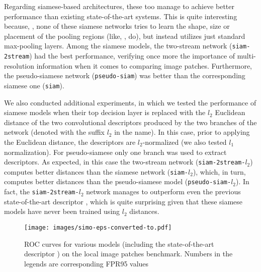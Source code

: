 \documentclass[10pt,twocolumn,letterpaper]{article}
\newcommand*{\USEIMAGES}{}
\begin{document}
Regarding siamese-based architectures, these too manage to achieve  better performance than  existing state-of-the-art systems. This is quite interesting because, \eg, none of these siamese networks tries to learn the shape, size or placement of the pooling regions (like, \eg, \cite{Simonyan14, BHW10} do), but instead utilizes just standard max-pooling layers.
Among the siamese models, the two-stream network (\texttt{siam-2stream}) had the best performance,  
verifying once more the importance of multi-resolution information  when it comes to comparing image patches. Furthermore,  the pseudo-siamese network (\texttt{pseudo-siam}) was better than the corresponding siamese one (\texttt{siam}).

We also conducted additional experiments, in which we tested the performance of siamese models when their top decision layer is replaced with the $l_2$ Euclidean distance of the two convolutional descriptors produced by the two branches of the network (denoted with the suffix $l_2$ in the name). In this case, prior to applying the Euclidean distance, the descriptors are $l_2$-normalized (we also tested $l_1$ %
normalization). 
For pseudo-siamese only one branch was used
to extract descriptors. As expected, in this case the two-stream network (\texttt{siam-2stream-}$l_2$) computes better distances  than the siamese network (\texttt{siam-}$l_2$), which, in turn, computes better distances than the pseudo-siamese model (\texttt{pseudo-siam-}$l_2$).  In fact,  the  \texttt{siam-2stream-}$l_2$ network manages to outperform even the previous state-of-the-art descriptor \cite{Simonyan14}, which is quite surprising given that these siamese models have never been trained  using $l_2$ distances.
 
 \ifdefined\USEIMAGES
\begin{figure*}[t]
\begin{center}
\texttt{[image: images/simo-eps-converted-to.pdf]}
\end{center}
\vspace{-6pt}
\caption{ROC curves for various models (including the state-of-the-art descriptor \cite{Simonyan14}) on the local image patches benchmark. Numbers in the legends are corresponding FPR95 values}
\vspace{-3pt}
\label{fig:standard_benchmark_plots}
\end{figure*}
\fi
\end{document}
